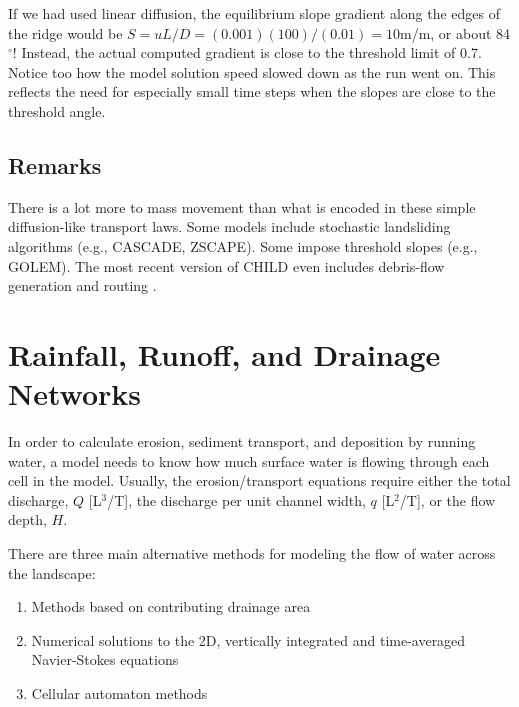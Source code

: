 \documentclass[12pt]{amsart}
\begin{document}
{\em
{}
If we had used linear diffusion, the equilibrium slope gradient along the edges of the ridge would be $S = uL/D = (0.001)(100)/(0.01) = 10$m/m, or about 84$^\circ$! Instead, the actual computed gradient is close to the threshold limit of 0.7. Notice too how the model solution speed slowed down as the run went on. This reflects the need for especially small time steps when the slopes are close to the threshold angle.
}

\subsection{Remarks}

There is a lot more to mass movement than what is encoded in these simple diffusion-like transport laws. Some models include stochastic landsliding algorithms (e.g., CASCADE, ZSCAPE). Some impose threshold slopes (e.g., GOLEM). The most recent version of CHILD even includes debris-flow generation and routing \citep{lancaster2003effects}.

\section{Rainfall, Runoff, and Drainage Networks}

In order to calculate erosion, sediment transport, and deposition by running water, a model needs to know how much surface water is flowing through each cell in the model. Usually, the erosion/transport equations require either the total discharge, $Q$ [L$^3$/T], the discharge per unit channel width, $q$ [L$^2$/T], or the flow depth, $H$.

There are three main alternative methods for modeling the flow of water across the landscape:
\begin{enumerate}
\item Methods based on contributing drainage area
\item Numerical solutions to the 2D, vertically integrated and time-averaged Navier-Stokes equations
\item Cellular automaton methods
\end{enumerate}
\end{document}
